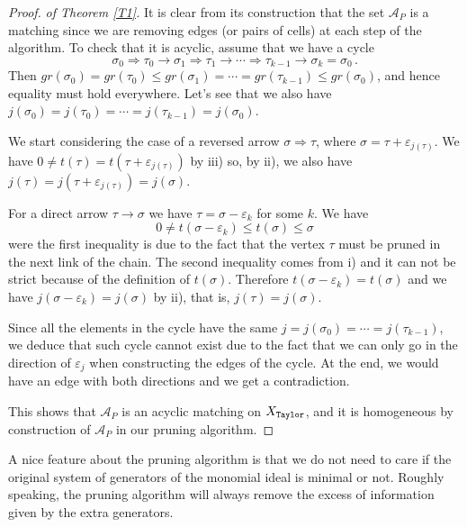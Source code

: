 \documentclass[12pt]{amsart}
\theoremstyle{definition}
\theoremstyle{remark}
\numberwithin{equation}{section}
\newcommand{\cA}{{\mathcal A}}
\newcommand{\lra}{{\longrightarrow}}
\newcommand{\phil}[1]{{\color{red} \sf $\star\star$ Philippe: [#1]}}
\begin{document}
\begin{proof}{\it of Theorem \ref{T1}.} \hskip 2mm It is clear from its construction that the set $\cA_P$ is a matching
since we are removing edges (or pairs of cells) at each step of the algorithm. To check that it is acyclic, assume that we
have a cycle%
$$\sigma_0 \Longrightarrow \tau_0 \lra \sigma_1 \Longrightarrow  \tau_1 \lra \cdots \Longrightarrow \tau_{k-1} \lra \sigma_k = \sigma_0\,.$$
Then $gr(\sigma_0)= gr(\tau_0) \leq gr(\sigma_1)=  \cdots = gr(\tau_{k-1})\leq gr(\sigma_0)$, and hence equality must hold
everywhere. Let's see that we also have
$j(\sigma_0)= j(\tau_0) =  \cdots = j(\tau_{k-1})=j(\sigma_0)$.

\vskip 2mm

We start considering the case of a reversed arrow
$\sigma \Longrightarrow \tau$, where $\sigma= \tau + \varepsilon_{j(\tau)}$. We have $0\neq t(\tau)= t(\tau + \varepsilon_{j(\tau)})$
by iii) so, by ii), we also have $j(\tau)=j(\tau + \varepsilon_{j(\tau)})=j(\sigma)$.

\vskip 2mm

For a direct arrow $\tau \lra \sigma$ we have $\tau=\sigma - \varepsilon_k$ for some $k$.
We have  $$0\neq t(\sigma - \varepsilon_k)\leq t(\sigma)\leq \sigma$$ were the first inequality is due to the fact that the
vertex $\tau$ must be pruned in the next link of the chain. The second inequality comes from i) and it can not be
strict because of the definition of $t(\sigma)$. Therefore $t(\sigma - \varepsilon_k)= t(\sigma)$ and we have
$j(\sigma - \varepsilon_k)= j(\sigma)$ by ii), that is, $j(\tau)= j(\sigma)$.

\vskip 2mm

Since all the elements in the cycle have the same $j=j(\sigma_0)= \cdots =j(\tau_{k-1})$, we deduce that such cycle
cannot exist due to the fact that we can only go in the direction of $\varepsilon_j$ when constructing the edges of the cycle.
At the end, we would have an edge with both directions and we get a contradiction.

\vskip 2mm

This shows that  $\cA_P$ is an acyclic matching on $X_{\tt Taylor}$, and it is homogeneous by construction of
 $\cA_P$ in our pruning algorithm.
\end{proof}





A nice feature about the pruning algorithm is that
we do not need to care if the original system of generators of the monomial ideal
is minimal or not.
Roughly speaking, the pruning algorithm will always remove the
excess of information given by the extra generators.
\end{document}
